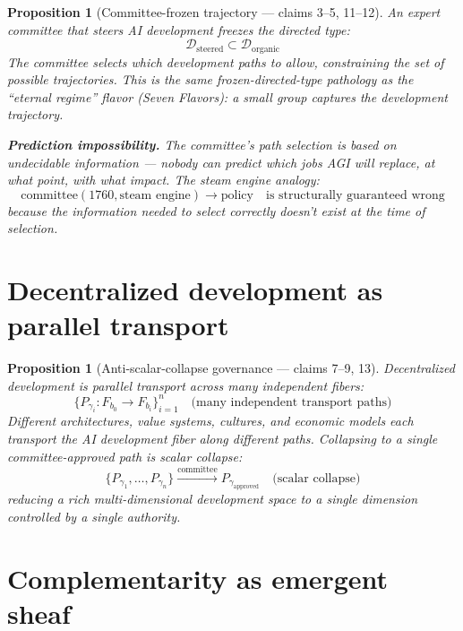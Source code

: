 \documentclass[11pt,a4paper]{article}
\newtheorem{proposition}[definition]{Proposition}
\begin{document}
\begin{proposition}[Committee-frozen trajectory --- claims 3--5, 11--12]
\label{prop:frozen}
An expert committee that steers AI development freezes the directed type:
\[
  \mathcal{D}_{\text{steered}} \subset \mathcal{D}_{\text{organic}}
\]
The committee selects which development paths to allow, constraining the
set of possible trajectories. This is the same frozen-directed-type
pathology as the ``eternal regime'' flavor (Seven Flavors): a small
group captures the development trajectory.

\textbf{Prediction impossibility.} The committee's path selection is
based on undecidable information --- nobody can predict which jobs AGI
will replace, at what point, with what impact. The steam engine analogy:
\[
  \text{committee}(1760, \text{steam engine}) \to \text{policy}
  \quad \text{is structurally guaranteed wrong}
\]
because the information needed to select correctly doesn't exist at
the time of selection.
\end{proposition}

\section{Decentralized development as parallel transport}

\begin{proposition}[Anti-scalar-collapse governance --- claims 7--9, 13]
\label{prop:parallel}
Decentralized development is parallel transport across many independent
fibers:
\[
  \{P_{\gamma_i}: F_{b_0} \to F_{b_i}\}_{i=1}^n \quad \text{(many
    independent transport paths)}
\]
Different architectures, value systems, cultures, and economic models
each transport the AI development fiber along different paths.
Collapsing to a single committee-approved path is scalar collapse:
\[
  \{P_{\gamma_1}, \ldots, P_{\gamma_n}\} \xrightarrow{\text{committee}}
    P_{\gamma_{\text{approved}}} \quad \text{(scalar collapse)}
\]
reducing a rich multi-dimensional development space to a single
dimension controlled by a single authority.
\end{proposition}

\section{Complementarity as emergent sheaf}
\end{document}
